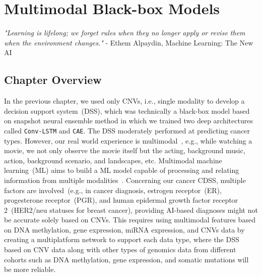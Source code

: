 \chapter{Multimodal Black-box Models}
\label{chapter:multiodality}

\textit{"Learning is lifelong; we forget rules when they no longer apply or revise them when the environment changes."} - Ethem Alpaydin, Machine Learning: The New AI 

\section{Chapter Overview}
In the previous chapter, we used only CNVs, i.e., single modality to develop a decision support system~(DSS), which was technically a black-box model based on snapshot neural ensemble method in which we trained two deep architectures called \texttt{Conv-LSTM} and \texttt{CAE}. The DSS moderately performed at predicting cancer types. However, our real world experience is multimodal~\cite{mmsurvey}, e.g., while watching a movie, we not only observe the movie itself but the acting, background music, action, background scenario, and landscapes, etc. Multimodal machine learning~(ML) aims to build a ML model capable of processing and relating information from multiple modalities~\cite{mmsurvey}. Concerning our cancer CDSS, multiple factors are involved~(e.g., in cancer diagnosis, estrogen receptor~(ER), progesterone receptor~(PGR), and human epidermal growth factor receptor 2~(HER2/neu statuses for breast cancer), providing AI-based diagnoses might not be accurate solely based on CNVs. This requires using multimodal features based on DNA methylation, gene expression, miRNA expression, and CNVs data by creating a multiplatform network to support each data type, where the DSS based on CNV data along with other types of genomics data from different cohorts such as DNA methylation, gene expression, and somatic mutations will be more reliable. 

